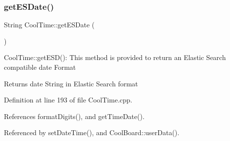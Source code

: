 \subsubsection{\texorpdfstring{get\+E\+S\+Date()}{getESDate()}}
{\footnotesize\ttfamily String Cool\+Time\+::get\+E\+S\+Date (\begin{DoxyParamCaption}{ }\end{DoxyParamCaption})}

Cool\+Time\+::get\+E\+S\+D()\+: This method is provided to return an Elastic Search compatible date Format

\begin{DoxyReturn}{Returns}
date String in Elastic Search format 
\end{DoxyReturn}


Definition at line 193 of file Cool\+Time.\+cpp.



References format\+Digits(), and get\+Time\+Date().



Referenced by set\+Date\+Time(), and Cool\+Board\+::user\+Data().


